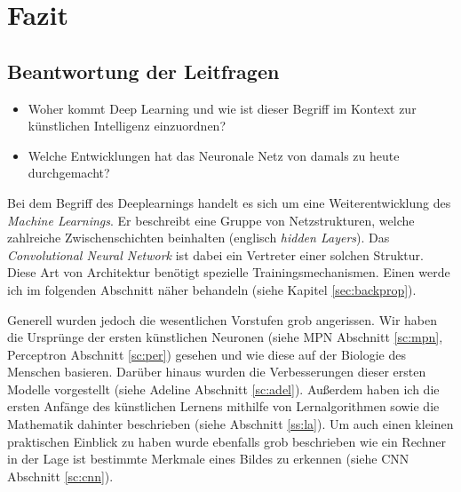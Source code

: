 \section{Fazit}

\subsection{Beantwortung der Leitfragen}

\begin{itemize}
\item Woher kommt Deep Learning und wie ist dieser Begriff im Kontext zur künstlichen Intelligenz einzuordnen?
\item Welche Entwicklungen hat das Neuronale Netz von damals zu heute durchgemacht?
\end{itemize}

Bei dem Begriff des Deeplearnings handelt es sich um eine Weiterentwicklung des \emph{Machine Learnings}. Er beschreibt eine Gruppe von Netzstrukturen, welche zahlreiche Zwischenschichten beinhalten (englisch \emph{hidden Layers}). Das \emph{Convolutional Neural Network} ist dabei ein Vertreter einer solchen Struktur. Diese Art von Architektur benötigt spezielle Trainingsmechanismen. Einen werde ich im folgenden Abschnitt näher behandeln (siehe Kapitel \ref{sec:backprop}). 

Generell wurden jedoch die wesentlichen Vorstufen grob angerissen. Wir haben die Ursprünge der ersten künstlichen Neuronen (siehe MPN Abschnitt \ref{sc:mpn}, Perceptron Abschnitt \ref{sc:per}) gesehen und wie diese auf der Biologie des Menschen basieren. Darüber hinaus wurden die Verbesserungen dieser ersten Modelle vorgestellt (siehe Adeline Abschnitt \ref{sc:adel}). Außerdem haben ich die ersten Anfänge des künstlichen Lernens mithilfe von Lernalgorithmen sowie die Mathematik dahinter beschrieben (siehe Abschnitt \ref{ss:la}). Um auch einen kleinen praktischen Einblick zu haben wurde ebenfalls grob beschrieben wie ein Rechner in der Lage ist bestimmte Merkmale eines Bildes zu erkennen (siehe CNN Abschnitt \ref{sc:cnn}). 
